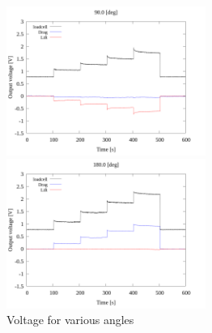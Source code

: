 \begin{figure}[htbp]
\begin{minipage}[b]{0.45\linewidth}
  \end{minipage}\\
  \begin{minipage}[b]{0.45\linewidth}
    \centering
    \includegraphics[width=65mm]{../../02_workspace/result/2-1/plot/01-3_allsensors/01_allsensors_900.png}
  \end{minipage}
  \begin{minipage}[b]{0.45\linewidth}
    \centering
    \includegraphics[width=65mm]{../../02_workspace/result/2-1/plot/01-3_allsensors/01_allsensors_1800.png}
  \end{minipage}
  \caption{Voltage for various angles}
\end{figure}

